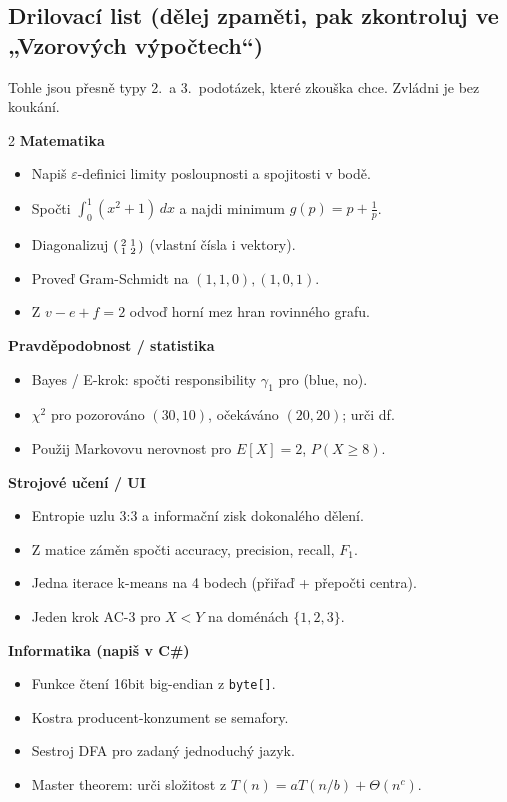 \subsection{Drilovací list (dělej zpaměti, pak zkontroluj ve „Vzorových výpočtech“)}
{\small Tohle jsou přesně typy 2.\ a 3.\ podotázek, které zkouška chce. Zvládni je bez koukání.}
\begin{multicols}{2}\small
\textbf{Matematika}
\begin{itemize}[leftmargin=1.1em,itemsep=1pt,topsep=2pt]
  \item Napiš $\varepsilon$-definici limity posloupnosti a spojitosti v bodě.
  \item Spočti $\int_0^1 (x^2+1)\,dx$ a najdi minimum $g(p)=p+\tfrac1p$.
  \item Diagonalizuj $\begin{psmallmatrix}2&1\\1&2\end{psmallmatrix}$ (vlastní čísla i vektory).
  \item Proveď Gram-Schmidt na $(1,1,0),(1,0,1)$.
  \item Z $v-e+f=2$ odvoď horní mez hran rovinného grafu.
\end{itemize}
\textbf{Pravděpodobnost / statistika}
\begin{itemize}[leftmargin=1.1em,itemsep=1pt,topsep=2pt]
  \item Bayes / E-krok: spočti responsibility $\gamma_1$ pro (blue, no).
  \item $\chi^2$ pro pozorováno $(30,10)$, očekáváno $(20,20)$; urči df.
  \item Použij Markovovu nerovnost pro $E[X]=2$, $P(X\ge8)$.
\end{itemize}

\textbf{Strojové učení / UI}
\begin{itemize}[leftmargin=1.1em,itemsep=1pt,topsep=2pt]
  \item Entropie uzlu 3:3 a informační zisk dokonalého dělení.
  \item Z matice záměn spočti accuracy, precision, recall, $F_1$.
  \item Jedna iterace k-means na 4 bodech (přiřaď + přepočti centra).
  \item Jeden krok AC-3 pro $X<Y$ na doménách $\{1,2,3\}$.
\end{itemize}
\textbf{Informatika (napiš v C\#)}
\begin{itemize}[leftmargin=1.1em,itemsep=1pt,topsep=2pt]
  \item Funkce čtení 16bit big-endian z \texttt{byte[]}.
  \item Kostra producent-konzument se semafory.
  \item Sestroj DFA pro zadaný jednoduchý jazyk.
  \item Master theorem: urči složitost z $T(n)=aT(n/b)+\Theta(n^c)$.
\end{itemize}
\end{multicols}

